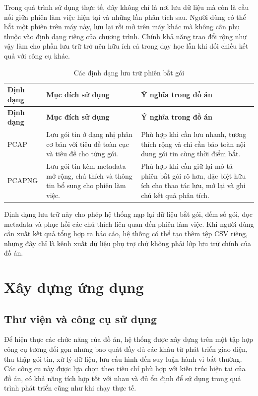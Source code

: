 \documentclass[../DoAn.tex]{subfiles}
\begin{document}
Trong quá trình sử dụng thực tế, đây không chỉ là nơi lưu dữ liệu mà còn là cầu nối giữa phiên làm việc hiện tại và những lần phân tích sau. Người dùng có thể bắt một phiên trên máy này, lưu lại rồi mở trên máy khác mà không cần phụ thuộc vào định dạng riêng của chương trình. Chính khả năng trao đổi rộng như vậy làm cho phần lưu trữ trở nên hữu ích cả trong dạy học lẫn khi đối chiếu kết quả với công cụ khác.

\begin{longtable}{|p{3.0cm}|p{4.4cm}|p{4.6cm}|}
\caption{Các định dạng lưu trữ phiên bắt gói} \label{tab:schema_capture_files} \\
\hline
\textbf{Định dạng} & \textbf{Mục đích sử dụng} & \textbf{Ý nghĩa trong đồ án} \\ \hline
\endfirsthead
\hline
\textbf{Định dạng} & \textbf{Mục đích sử dụng} & \textbf{Ý nghĩa trong đồ án} \\ \hline
\endhead
\hline
\endfoot
\hline
\endlastfoot
PCAP & Lưu gói tin ở dạng nhị phân cơ bản với tiêu đề toàn cục và tiêu đề cho từng gói. & Phù hợp khi cần lưu nhanh, tương thích rộng và chỉ cần bảo toàn nội dung gói tin cùng thời điểm bắt. \\ \hline
PCAPNG & Lưu gói tin kèm metadata mở rộng, chú thích và thông tin bổ sung cho phiên làm việc. & Phù hợp khi cần giữ lại mô tả phiên bắt gói rõ hơn, đặc biệt hữu ích cho thao tác lưu, mở lại và ghi chú kết quả phân tích. \\ \hline
\end{longtable}

Định dạng lưu trữ này cho phép hệ thống nạp lại dữ liệu bắt gói, đếm số gói, đọc metadata và phục hồi các chú thích liên quan đến phiên làm việc. Khi người dùng cần xuất kết quả tổng hợp ra báo cáo, hệ thống có thể tạo thêm tệp CSV riêng, nhưng đây chỉ là kênh xuất dữ liệu phụ trợ chứ không phải lớp lưu trữ chính của đồ án.
\section{Xây dựng ứng dụng}
\subsection{Thư viện và công cụ sử dụng}
Để hiện thực các chức năng của đồ án, hệ thống được xây dựng trên một tập hợp công cụ tương đối gọn nhưng bao quát đầy đủ các khâu từ phát triển giao diện, thu thập gói tin, xử lý dữ liệu, lưu cấu hình đến suy luận hành vi bất thường. Các công cụ này được lựa chọn theo tiêu chí phù hợp với kiến trúc hiện tại của đồ án, có khả năng tích hợp tốt với nhau và đủ ổn định để sử dụng trong quá trình phát triển cũng như khi chạy thực tế.
\end{document}
